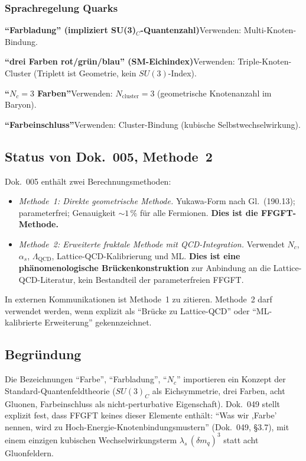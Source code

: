 \subsubsection*{Sprachregelung Quarks}

\smallskip\noindent \textbf{\enquote{Farbladung} (impliziert SU(3)$_C$-Quantenzahl)}\quad Verwenden: Multi-Knoten-Bindung.

\smallskip\noindent \textbf{\enquote{drei Farben rot/grün/blau} (SM-Eichindex)}\quad Verwenden: Triple-Knoten-Cluster (Triplett ist Geometrie, kein $SU(3)$-Index).

\smallskip\noindent \textbf{\enquote{$N_c = 3$ Farben}}\quad Verwenden: $N_{\text{cluster}} = 3$ (geometrische Knotenanzahl im Baryon).

\smallskip\noindent \textbf{\enquote{Farbeinschluss}}\quad Verwenden: Cluster-Bindung (kubische Selbstwechselwirkung).

\medskip


\subsection*{Status von Dok.~005, Methode~2}

Dok.~005 enthält zwei Berechnungsmethoden:
\begin{itemize}
  \item \emph{Methode~1: Direkte geometrische Methode.} Yukawa-Form
        nach Gl.~(190.13); parameterfrei; Genauigkeit $\sim 1\,\%$
        für alle Fermionen. \textbf{Dies ist die FFGFT-Methode.}
  \item \emph{Methode~2: Erweiterte fraktale Methode mit
        QCD-Integration.} Verwendet $N_c$, $\alpha_s$,
        $\Lambda_{\text{QCD}}$, Lattice-QCD-Kalibrierung und ML.
        \textbf{Dies ist eine phänomenologische Brückenkonstruktion}
        zur Anbindung an die Lattice-QCD-Literatur, kein Bestandteil
        der parameterfreien FFGFT.
\end{itemize}

In externen Kommunikationen ist Methode~1 zu zitieren. Methode~2 darf
verwendet werden, wenn explizit als \enquote{Brücke zu Lattice-QCD}
oder \enquote{ML-kalibrierte Erweiterung} gekennzeichnet.

\subsection*{Begründung}

Die Bezeichnungen \enquote{Farbe}, \enquote{Farbladung}, \enquote{$N_c$}
importieren ein Konzept der Standard-Quantenfeldtheorie ($SU(3)_C$ als
Eichsymmetrie, drei Farben, acht Gluonen, Farbeinschluss als
nicht-perturbative Eigenschaft). Dok.~049 stellt explizit fest, dass
FFGFT keines dieser Elemente enthält: \enquote{Was wir ,Farbe' nennen,
wird zu Hoch-Energie-Knotenbindungsmustern} (Dok.~049, §3.7), mit
einem einzigen kubischen Wechselwirkungsterm
$\lambda_s\,(\delta m_q)^3$ statt acht Gluonfeldern.

